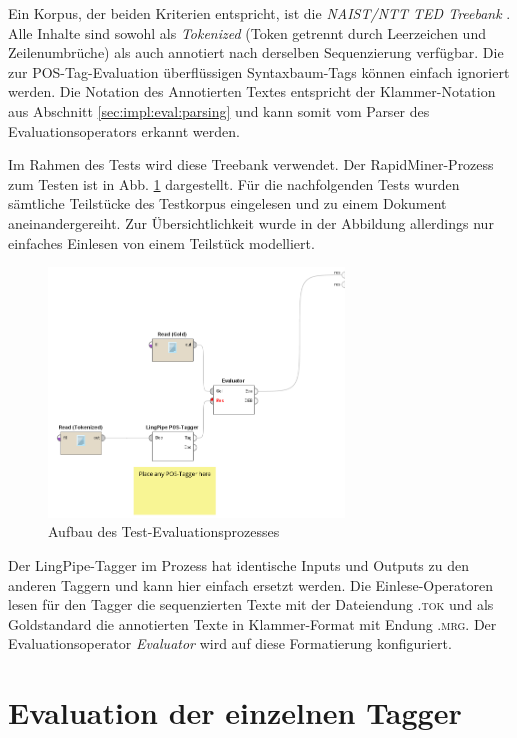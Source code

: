 Ein Korpus, der beiden Kriterien entspricht, ist die \textit{NAIST/NTT TED Treebank} \cite{tedbank}. Alle Inhalte sind sowohl als \textit{Tokenized} (Token getrennt durch Leerzeichen und Zeilenumbrüche) als auch annotiert nach derselben Sequenzierung verfügbar. Die zur POS-Tag-Evaluation überflüssigen Syntaxbaum-Tags können einfach ignoriert werden. Die Notation des Annotierten Textes entspricht der Klammer-Notation  aus Abschnitt \ref{sec:impl:eval:parsing} und kann somit vom Parser des Evaluationsoperators erkannt werden.

Im Rahmen des Tests wird diese Treebank verwendet. Der RapidMiner-Prozess zum Testen ist in Abb. \ref{fig:eval:corpus:process} dargestellt. Für die nachfolgenden Tests wurden sämtliche Teilstücke des Testkorpus eingelesen und zu einem Dokument aneinandergereiht. Zur Übersichtlichkeit wurde in der Abbildung allerdings nur einfaches Einlesen von einem Teilstück modelliert. 

\begin{figure}[htb]
	\centering
	\captionsetup{justification=centering,margin=2cm}
	\includegraphics[width=0.7\textwidth]{gfx/process.png}
	
	\caption{Aufbau des Test-Evaluationsprozesses} 
	\label{fig:eval:corpus:process}
\end{figure}

Der LingPipe-Tagger im Prozess hat identische Inputs und Outputs zu den anderen Taggern und kann hier einfach ersetzt werden. Die Einlese-Operatoren lesen für den Tagger die sequenzierten Texte mit der Dateiendung \textsc{.tok} und als Goldstandard die annotierten Texte in Klammer-Format mit Endung \textsc{.mrg}. Der Evaluationsoperator \textit{Evaluator} wird auf diese Formatierung konfiguriert.

\section{Evaluation der einzelnen Tagger}
\label{sec:eval:detail}

